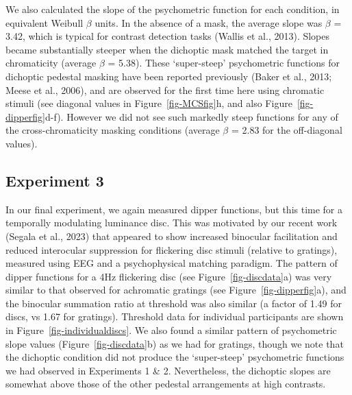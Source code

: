 \documentclass[
  letterpaper,
  DIV=11,
  numbers=noendperiod]{scrartcl}
\begin{document}
We also calculated the slope of the psychometric function for each
condition, in equivalent Weibull \(\beta\) units. In the absence of a
mask, the average slope was \(\beta\) = 3.42, which is typical for
contrast detection tasks (Wallis et al., 2013). Slopes became
substantially steeper when the dichoptic mask matched the target in
chromaticity (average \(\beta\) = 5.38). These `super-steep'
psychometric functions for dichoptic pedestal masking have been reported
previously (Baker et al., 2013; Meese et al., 2006), and are observed
for the first time here using chromatic stimuli (see diagonal values in
Figure~\ref{fig-MCSfig}h, and also Figure~\ref{fig-dipperfig}d-f).
However we did not see such markedly steep functions for any of the
cross-chromaticity masking conditions (average \(\beta\) = 2.83 for the
off-diagonal values).

\hypertarget{experiment-3}{%
\subsection{Experiment 3}\label{experiment-3}}

In our final experiment, we again measured dipper functions, but this
time for a temporally modulating luminance disc. This was motivated by
our recent work (Segala et al., 2023) that appeared to show increased
binocular facilitation and reduced interocular suppression for
flickering disc stimuli (relative to gratings), measured using EEG and a
psychophysical matching paradigm. The pattern of dipper functions for a
4Hz flickering disc (see Figure~\ref{fig-discdata}a) was very similar to
that observed for achromatic gratings (see Figure~\ref{fig-dipperfig}a),
and the binocular summation ratio at threshold was also similar (a
factor of 1.49 for discs, vs 1.67 for gratings). Threshold data for
individual participants are shown in Figure~\ref{fig-individualdiscs}.
We also found a similar pattern of psychometric slope values
(Figure~\ref{fig-discdata}b) as we had for gratings, though we note that
the dichoptic condition did not produce the `super-steep' psychometric
functions we had observed in Experiments 1 \& 2. Nevertheless, the
dichoptic slopes are somewhat above those of the other pedestal
arrangements at high contrasts.
\end{document}
